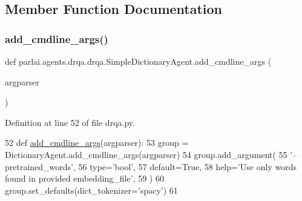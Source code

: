 \subsection{Member Function Documentation}
\mbox{\label{classparlai_1_1agents_1_1drqa_1_1drqa_1_1SimpleDictionaryAgent_a43e40daa2e8260d919347a8e40ae3ced}} 
\subsubsection{\texorpdfstring{add\+\_\+cmdline\+\_\+args()}{add\_cmdline\_args()}}
{\footnotesize\ttfamily def parlai.\+agents.\+drqa.\+drqa.\+Simple\+Dictionary\+Agent.\+add\+\_\+cmdline\+\_\+args (\begin{DoxyParamCaption}\item[{}]{argparser }\end{DoxyParamCaption})\hspace{0.3cm}{\ttfamily [static]}}



Definition at line 52 of file drqa.\+py.


\begin{DoxyCode}
52     \textcolor{keyword}{def }\hyperlink{namespaceparlai_1_1agents_1_1drqa_1_1config_a62fdd5554f1da6be0cba185271058320}{add\_cmdline\_args}(argparser):
53         group = DictionaryAgent.add\_cmdline\_args(argparser)
54         group.add\_argument(
55             \textcolor{stringliteral}{'--pretrained\_words'},
56             type=\textcolor{stringliteral}{'bool'},
57             default=\textcolor{keyword}{True},
58             help=\textcolor{stringliteral}{'Use only words found in provided embedding\_file'},
59         )
60         group.set\_defaults(dict\_tokenizer=\textcolor{stringliteral}{'spacy'})
61 
\end{DoxyCode}
\mbox{\label{classparlai_1_1agents_1_1drqa_1_1drqa_1_1SimpleDictionaryAgent_a5ccaf2bd28a50af2062ad2efd6a36e0e}} 
